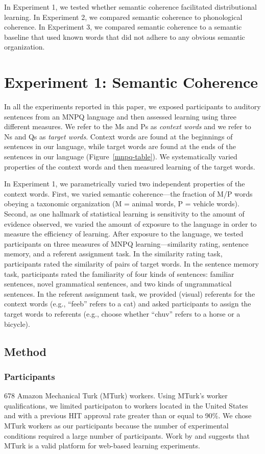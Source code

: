 \documentclass[man,floatsintext]{apa6}
\begin{document}
In Experiment 1, we tested whether semantic coherence facilitated distributional learning. In Experiment 2, we compared semantic coherence to phonological coherence. In Experiment 3, we compared semantic coherence to a semantic baseline that used known words that did not adhere to any obvious semantic organization.

\section{Experiment 1: Semantic Coherence}

In all the experiments reported in this paper, we exposed participants to auditory sentences from an MNPQ language and then assessed learning using three different measures. We refer to the Ms and Ps as \emph{context words} and we refer to Ns and Qs as \emph{target words}. Context words are found at the beginnings of sentences in our language, while target words are found at the ends of the sentences in our language (Figure~\ref{mnpq-table}). We systematically varied properties of the context words and then measured learning of the target words.

In Experiment 1, we parametrically varied two independent properties of the context words. First, we varied semantic coherence---the fraction of M/P words obeying a taxonomic organization (M = animal words, P = vehicle words). Second, as one hallmark of statistical learning is sensitivity to the amount of evidence observed, we varied the amount of exposure to the language in order to measure the efficiency of learning. After exposure to the language, we tested participants on three measures of MNPQ learning---similarity rating, sentence memory, and a referent assignment task. In the similarity rating task, participants rated the similarity of pairs of target words. In the sentence memory task, participants rated the familiarity of four kinds of sentences: familiar sentences, novel grammatical sentences, and two kinds of ungrammatical sentences. In the referent assignment task, we provided (visual) referents for the context words (e.g., ``feeb'' refers to a cat) and asked participants to assign the target words to referents (e.g., choose whether ``chuv'' refers to a horse or a bicycle).

\subsection{Method}

\subsubsection{Participants}
678 Amazon Mechanical Turk (MTurk) workers. Using MTurk's worker qualifications, we limited participaton to workers located in the United States and with a previous HIT approval rate greater than or equal to 90\%. We chose MTurk workers as our participants because the number of experimental conditions required a large number of participants. Work by \citet{buhrmester2010} and \citet{crump2013} suggests that MTurk is a valid platform for web-based learning experiments.
\end{document}
